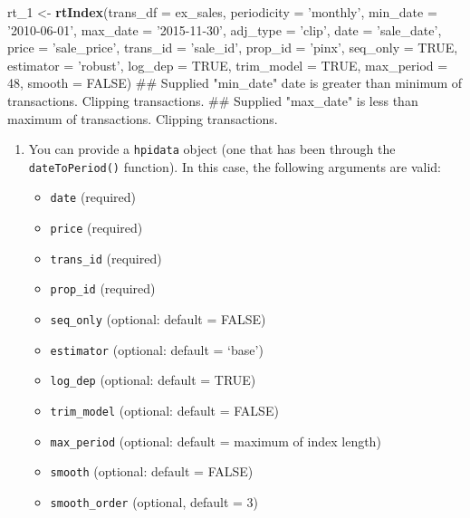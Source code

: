\documentclass[]{article}
\newenvironment{Shaded}{\begin{snugshade}}{\end{snugshade}}
\newcommand{\DataTypeTok}[1]{\textcolor[rgb]{0.13,0.29,0.53}{#1}}
\newcommand{\DecValTok}[1]{\textcolor[rgb]{0.00,0.00,0.81}{#1}}
\newcommand{\KeywordTok}[1]{\textcolor[rgb]{0.13,0.29,0.53}{\textbf{#1}}}
\newcommand{\NormalTok}[1]{#1}
\newcommand{\OtherTok}[1]{\textcolor[rgb]{0.56,0.35,0.01}{#1}}
\newcommand{\StringTok}[1]{\textcolor[rgb]{0.31,0.60,0.02}{#1}}
\providecommand{\tightlist}{%
  \setlength{\itemsep}{0pt}\setlength{\parskip}{0pt}}
\begin{document}
\begin{Shaded}
\begin{Highlighting}[]
\NormalTok{  rt_}\DecValTok{1}\NormalTok{ <-}\StringTok{ }\KeywordTok{rtIndex}\NormalTok{(}\DataTypeTok{trans_df =}\NormalTok{ ex_sales,}
                  \DataTypeTok{periodicity =} \StringTok{'monthly'}\NormalTok{,}
                  \DataTypeTok{min_date =} \StringTok{'2010-06-01'}\NormalTok{,}
                  \DataTypeTok{max_date =} \StringTok{'2015-11-30'}\NormalTok{,}
                  \DataTypeTok{adj_type =} \StringTok{'clip'}\NormalTok{,}
                  \DataTypeTok{date =} \StringTok{'sale_date'}\NormalTok{,}
                  \DataTypeTok{price =} \StringTok{'sale_price'}\NormalTok{,}
                  \DataTypeTok{trans_id =} \StringTok{'sale_id'}\NormalTok{,}
                  \DataTypeTok{prop_id =} \StringTok{'pinx'}\NormalTok{,}
                  \DataTypeTok{seq_only =} \OtherTok{TRUE}\NormalTok{,}
                  \DataTypeTok{estimator =} \StringTok{'robust'}\NormalTok{,}
                  \DataTypeTok{log_dep =} \OtherTok{TRUE}\NormalTok{,}
                  \DataTypeTok{trim_model =} \OtherTok{TRUE}\NormalTok{,}
                  \DataTypeTok{max_period =} \DecValTok{48}\NormalTok{,}
                  \DataTypeTok{smooth =} \OtherTok{FALSE}\NormalTok{)}
\NormalTok{## Supplied "min_date" date is greater than minimum of transactions. Clipping transactions.}
\NormalTok{## Supplied "max_date" is less than maximum of transactions. Clipping transactions.}
\end{Highlighting}
\end{Shaded}

\begin{enumerate}
\def\labelenumi{\arabic{enumi}.}
\setcounter{enumi}{1}
\item
  You can provide a \texttt{hpidata} object (one that has been through
  the \texttt{dateToPeriod()} function). In this case, the following
  arguments are valid:

  \begin{itemize}
  \tightlist
  \item
    \texttt{date} (required)
  \item
    \texttt{price} (required)
  \item
    \texttt{trans\_id} (required)
  \item
    \texttt{prop\_id} (required)
  \item
    \texttt{seq\_only} (optional: default = FALSE)
  \item
    \texttt{estimator} (optional: default = `base')
  \item
    \texttt{log\_dep} (optional: default = TRUE)
  \item
    \texttt{trim\_model} (optional: default = FALSE)
  \item
    \texttt{max\_period} (optional: default = maximum of index length)
  \item
    \texttt{smooth} (optional: default = FALSE)
  \item
    \texttt{smooth\_order} (optional, default = 3)
  \end{itemize}
\end{enumerate}
\end{document}
